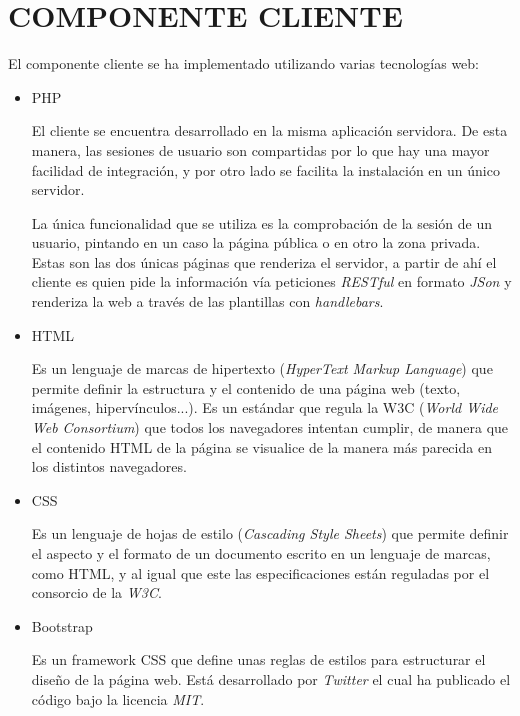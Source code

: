 \section{COMPONENTE CLIENTE}

El componente cliente se ha implementado utilizando varias tecnologías web:

    \begin{itemize}

        \item PHP

            El cliente se encuentra desarrollado en la misma aplicación servidora. De esta manera, las sesiones de usuario son compartidas por lo que hay una mayor facilidad de integración, y por otro lado se facilita la instalación en un único servidor.

            La única funcionalidad que se utiliza es la comprobación de la sesión de un usuario, pintando en un caso la página pública o en otro la zona privada. Estas son las dos únicas páginas que renderiza el servidor, a partir de ahí el cliente es quien pide la información vía peticiones \emph{RESTful} en formato \emph{JSon} y renderiza la web a través de las plantillas con \emph{handlebars}.

        \item HTML

            Es un lenguaje de marcas de hipertexto (\emph{HyperText Markup Language}) que permite definir la estructura y el contenido de una página web (texto, imágenes, hipervínculos...). Es un estándar que regula la W3C (\emph{World Wide Web Consortium}) que todos los navegadores intentan cumplir, de manera que el contenido HTML de la página se visualice de la manera más parecida en los distintos navegadores.

        \item CSS

            Es un lenguaje de hojas de estilo (\emph{Cascading Style Sheets}) que permite definir el aspecto y el formato de un documento escrito en un lenguaje de marcas, como HTML, y al igual que este las especificaciones están reguladas por el consorcio de la \emph{W3C}.

        \item Bootstrap

            Es un framework CSS que define unas reglas de estilos para estructurar el diseño de la página web. Está desarrollado por \emph{Twitter} el cual ha publicado el código bajo la licencia \emph{MIT}.


\end{itemize}
